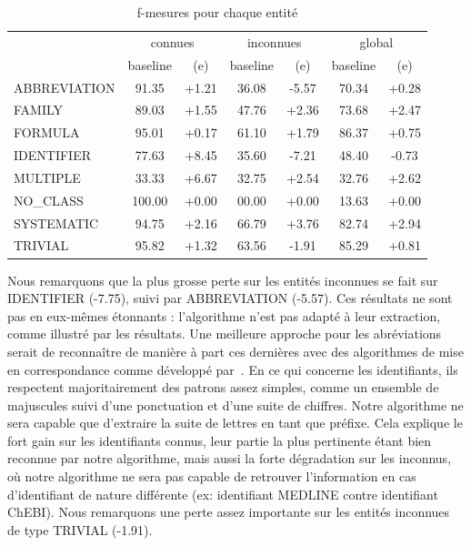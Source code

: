 \documentclass[12pt,a4paper,times,twoside,openright]{report}
\begin{document}
\begin{table}[ht!]
\centering
\begin{tabular}{|l|cc|cc|cc|}
\cline{2-7}
\multicolumn{1}{l|}{}   & \multicolumn{2}{c|}{connues} & \multicolumn{2}{c|}{inconnues} & \multicolumn{2}{c|}{global} \\
\multicolumn{1}{l|}{}   & baseline & (e)                & baseline & (e)                  & baseline & (e) \\
\hline
ABBREVIATION            & 91.35    & +1.21              & 36.08    & -5.57                & 70.34    & +0.28 \\
FAMILY                  & 89.03    & +1.55              & 47.76    & +2.36                & 73.68    & +2.47 \\
FORMULA                 & 95.01    & +0.17              & 61.10    & +1.79                & 86.37    & +0.75 \\
IDENTIFIER              & 77.63    & +8.45              & 35.60    & -7.21                & 48.40    & -0.73 \\
MULTIPLE                & 33.33    & +6.67              & 32.75    & +2.54                & 32.76    & +2.62 \\
NO\_CLASS               & 100.00   & +0.00              & 00.00    & +0.00                & 13.63    & +0.00 \\
SYSTEMATIC              & 94.75    & +2.16              & 66.79    & +3.76                & 82.74    & +2.94 \\
TRIVIAL                 & 95.82    & +1.32              & 63.56    & -1.91                & 85.29    & +0.81 \\
\hline
\end{tabular}
\caption{f-mesures pour chaque entité}
\label{tab:entity-fscores}
\end{table}

Nous remarquons que la plus grosse perte sur les entités inconnues se fait sur IDENTIFIER (-7.75), suivi par ABBREVIATION (-5.57). Ces résultats ne sont pas en eux-mêmes étonnants : l'algorithme n'est pas adapté à leur extraction, comme illustré par les résultats. Une meilleure approche pour les abréviations serait de reconnaître de manière à part ces dernières avec des algorithmes de mise en correspondance comme développé par\ \citet{hearst2003simple}. En ce qui concerne les identifiants, ils respectent majoritairement des patrons assez simples, comme un ensemble de majuscules suivi d'une ponctuation et d'une suite de chiffres. Notre algorithme ne sera capable que d'extraire la suite de lettres en tant que préfixe. Cela explique le fort gain sur les identifiants connus, leur partie la plus pertinente étant bien reconnue par notre algorithme, mais aussi la forte dégradation sur les inconnus, où notre algorithme ne sera pas capable de retrouver l'information en cas d'identifiant de nature différente (ex: identifiant MEDLINE contre identifiant ChEBI). Nous remarquons une perte assez importante sur les entités inconnues de type TRIVIAL (-1.91).
\end{document}
